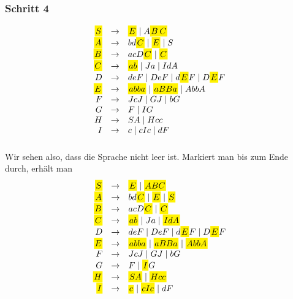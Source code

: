 \documentclass{article}
\begin{document}
\begin{multicols}{2}
   \subsubsection{Schritt 4}

   \begin{equation*}
      \begin{array}{rcl}
         \grule{\marked{S}}{\marked{E} \mid A\marked{B}\marked{C}} \\
         \grule{\marked{A}}{bd\marked{C} \mid \marked{E} \mid S} \\
         \grule{\marked{B}}{acD\marked{C} \mid \marked{C}} \\
         \grule{\marked{C}}{\marked{ab} \mid Ja \mid IdA} \\
         \grule{D}{deF \mid DeF \mid d\marked{E}F \mid D\marked{E}F} \\
         \grule{\marked{E}}{\marked{abba}\mid \marked{aBBa} \mid AbbA} \\
         \grule{F}{JcJ \mid GJ \mid bG} \\
         \grule{G}{F \mid IG} \\
         \grule{H}{SA \mid Hcc} \\
         \grule{I}{c \mid cIc \mid dF} \\
      \end{array}
   \end{equation*}

   \subsubsection{}

   Wir sehen also, dass die Sprache nicht leer ist. Markiert man bis zum Ende
   durch, erhält man
   \begin{equation*}
      \begin{array}{rcl}
         \grule{\marked{S}}{\marked{E} \mid \marked{ABC}} \\
         \grule{\marked{A}}{bd\marked{C} \mid \marked{E} \mid \marked{S}} \\
         \grule{\marked{B}}{acD\marked{C} \mid \marked{C}} \\
         \grule{\marked{C}}{\marked{ab} \mid Ja \mid \marked{IdA}} \\
         \grule{D}{deF \mid DeF \mid d\marked{E}F \mid D\marked{E}F} \\
         \grule{\marked{E}}{\marked{abba}\mid \marked{aBBa} \mid \marked{AbbA}} \\
         \grule{F}{JcJ \mid GJ \mid bG} \\
         \grule{G}{F \mid \marked{I}G} \\
         \grule{\marked{H}}{\marked{SA} \mid \marked{Hcc}} \\
         \grule{\marked{I}}{\marked{c} \mid \marked{cIc} \mid dF}
      \end{array}
   \end{equation*}
\end{multicols}
\end{document}
